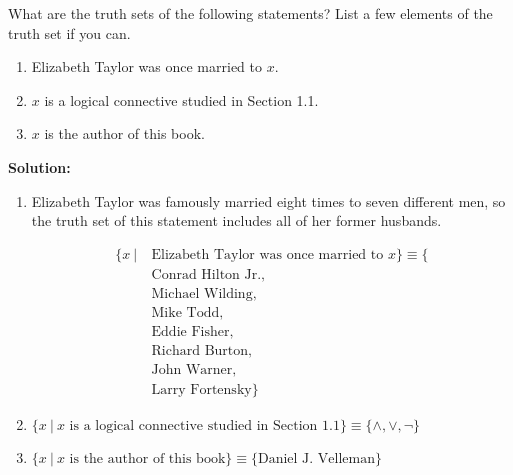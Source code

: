 What are the truth sets of the following statements? List a few elements of the truth set if you can.
\begin{enumerate}[label=(\alph*)]
    \item Elizabeth Taylor was once married to $x$.
    \item $x$ is a logical connective studied in Section 1.1.
    \item $x$ is the author of this book.
\end{enumerate}

\textbf{Solution:}
\begin{enumerate}[label=(\alph*)]
    \item Elizabeth Taylor was famously married eight times to seven different men, so the truth set of this statement includes all of her former husbands.

\begin{align*}
\{ x \ | \ &\text{Elizabeth Taylor was once married to } x \} \equiv \{\\
&\text{Conrad Hilton Jr.}, \\
&\text{Michael Wilding}, \\
&\text{Mike Todd}, \\
&\text{Eddie Fisher}, \\
&\text{Richard Burton}, \\
&\text{John Warner}, \\
&\text{Larry Fortensky}\}
\end{align*}

    \item $\{ x \ | \ x \text{ is a logical connective studied in Section 1.1} \} \equiv \{\wedge, \vee, \neg\}$
    \item $\{ x \ | \ x \text{ is the author of this book} \} \equiv \{\text{Daniel J. Velleman}\}$
\end{enumerate}

\pagebreak